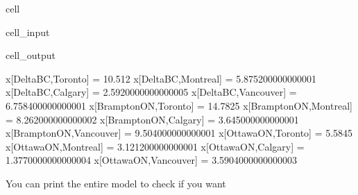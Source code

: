 \documentclass[letterpaper,10pt,english]{jupyterBook}
\begin{document}
\begin{sphinxuseclass}{cell}\begin{sphinxVerbatimInput}

\begin{sphinxuseclass}{cell_input}
\begin{sphinxVerbatim}[commandchars=\\\{\}]

   
     
      \PYG{p}{[}\PYG{p}{]}  \PYG{p}{[}\PYG{p}{]}\PYG{p}{[}\PYG{p}{]}\PYG{p}{[}\PYG{p}{]}
      
\end{sphinxVerbatim}

\end{sphinxuseclass}\end{sphinxVerbatimInput}
\begin{sphinxVerbatimOutput}

\begin{sphinxuseclass}{cell_output}
\begin{sphinxVerbatim}[commandchars=\\\{\}]
x[Delta\PYGZhy{}BC,Toronto]  \PYGZlt{}=  10.512
x[Delta\PYGZhy{}BC,Montreal]  \PYGZlt{}=  5.875200000000001
x[Delta\PYGZhy{}BC,Calgary]  \PYGZlt{}=  2.5920000000000005
x[Delta\PYGZhy{}BC,Vancouver]  \PYGZlt{}=  6.758400000000001
x[Brampton\PYGZhy{}ON,Toronto]  \PYGZlt{}=  14.7825
x[Brampton\PYGZhy{}ON,Montreal]  \PYGZlt{}=  8.262000000000002
x[Brampton\PYGZhy{}ON,Calgary]  \PYGZlt{}=  3.645000000000001
x[Brampton\PYGZhy{}ON,Vancouver]  \PYGZlt{}=  9.504000000000001
x[Ottawa\PYGZhy{}ON,Toronto]  \PYGZlt{}=  5.5845
x[Ottawa\PYGZhy{}ON,Montreal]  \PYGZlt{}=  3.121200000000001
x[Ottawa\PYGZhy{}ON,Calgary]  \PYGZlt{}=  1.3770000000000004
x[Ottawa\PYGZhy{}ON,Vancouver]  \PYGZlt{}=  3.5904000000000003
\end{sphinxVerbatim}

\end{sphinxuseclass}\end{sphinxVerbatimOutput}

\end{sphinxuseclass}
\sphinxAtStartPar
You can print the entire model to check if you want
\end{document}

